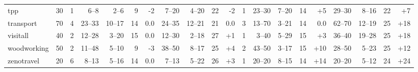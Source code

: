\documentclass{article}
\begin{document}
\begin{table}
\begin{tabular}{l@{}rr|rrrr|rrrr|r|rrrr|rrrr}
          tpp &    30 &   1 &    6--8 &   2--6 &   9 &  {\color{red}-2} &   7--20 &  4--20 &  22 &   {\color{red}-2} &   1 &   23--30 &  7--20 &  14 &  {\color{blue}+5} &   29--30 &  8--16 &  22 &  {\color{blue}+7} \\
    transport &    70 &   4 &  23--33 & 10--17 &  14 &              0.0 &  24--35 & 12--21 &  21 &               0.0 &   3 &   13--70 &  3--21 &  14 &               0.0 &   62--70 & 12--19 &  25 & {\color{blue}+18} \\
     visitall &    40 &   2 &  12--28 &  3--20 &  15 &              0.0 &  12--30 &  2--18 &  27 &  {\color{blue}+1} &   1 &    3--40 &  5--29 &  15 &  {\color{blue}+3} &   36--40 & 19--28 &  25 & {\color{blue}+18} \\
  woodworking &    50 &   2 &  11--48 &  5--10 &   9 &  {\color{red}-3} &  38--50 &  8--17 &  25 &  {\color{blue}+4} &   2 &   43--50 &  3--17 &  15 & {\color{blue}+10} &   28--50 &  5--23 &  25 & {\color{blue}+12} \\
   zenotravel &    20 &   6 &   8--13 &  5--16 &  14 &              0.0 &   7--13 &  5--22 &  26 &  {\color{blue}+3} &   1 &   20--20 &  8--15 &  14 & {\color{blue}+14} &   20--20 &  5--12 &  24 & {\color{blue}+24} \\
\bottomrule
\end{tabular}

                        \end{table}
                        
\end{document}
